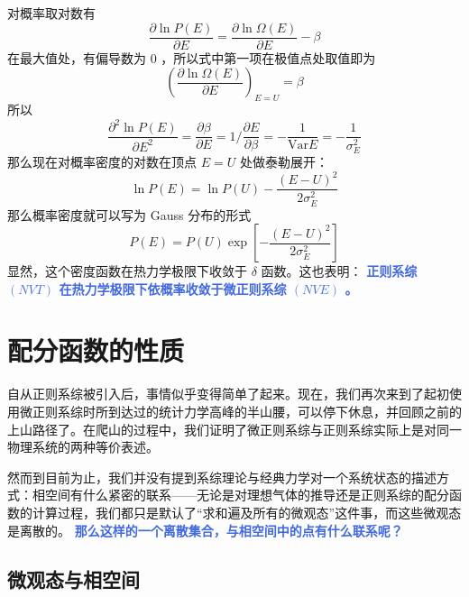 \documentclass[hyperref,UTF-8]{ctexbook}
\newcommand{\0}{\boldsymbol{0}}
\begin{document}
对概率取对数有
\[
    \frac{\partial \ln P(E)}{\partial E} = \frac{\partial \ln \Omega (E)}{\partial E} - \beta
\]
在最大值处，有偏导数为 $0$ ，所以式中第一项在极值点处取值即为
\[
    \left(\frac{\partial \ln \Omega (E)}{\partial E}\right)_{E = U} = \beta
\]
所以
\[
    \frac{\partial^2 \ln P(E)}{\partial E^2} = \frac{\partial \beta}{\partial E} = 1\bigg/\frac{\partial E}{\partial \beta} = -\frac{1}{\text{Var}E}  = -\frac{1}{\sigma^2_E}
\]
那么现在对概率密度的对数在顶点 $E = U$ 处做泰勒展开：
\[
    \ln P(E) = \ln P(U) -\frac{(E - U)^2}{2\sigma^2_E}
\]
那么概率密度就可以写为 Gauss 分布的形式
\begin{equation}
    P(E) = P(U)\exp\left[-\frac{(E - U)^2}{2\sigma^2_E}\right]
\end{equation}
显然，这个密度函数在热力学极限下收敛于 $\delta$ 函数。这也表明： \textcolor{RoyalBlue}{\textbf{\kaishu 正则系综 $(NVT)$ 在热力学极限下依概率收敛于微正则系综 $(NVE)$ 。}}

\section{配分函数的性质}\label{sec:配分函数的性质}

自从正则系综被引入后，事情似乎变得简单了起来。现在，我们再次来到了起初使用微正则系综时所到达过的统计力学高峰的半山腰，可以停下休息，并回顾之前的上山路径了。在爬山的过程中，我们证明了微正则系综与正则系综实际上是对同一物理系统的两种等价表述。

然而到目前为止，我们并没有提到系综理论与经典力学对一个系统状态的描述方式：相空间有什么紧密的联系——无论是对理想气体的推导还是正则系综的配分函数的计算过程，我们都只是默认了“求和遍及所有的微观态”这件事，而这些微观态是离散的。 \textcolor{RoyalBlue}{\textbf{\kaishu 那么这样的一个离散集合，与相空间中的点有什么联系呢？}}

\subsection{微观态与相空间}
\end{document}

